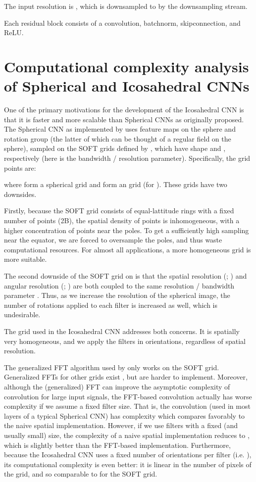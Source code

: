 \documentclass{article}
\begin{document}
The input resolution is , which is downsampled to  by the downsampling stream.

Each residual block consists of a convolution, batchnorm, skipconnection, and ReLU.


\section{Computational complexity analysis of Spherical and Icosahedral CNNs}

One of the primary motivations for the development of the Icosahedral CNN is that it is faster and more scalable than Spherical CNNs as originally proposed.
The Spherical CNN as implemented by \cite{cohenSphericalCNNs2018} uses feature maps on the sphere  and rotation group  (the latter of which can be thought of a regular field on the sphere), sampled on the SOFT grids defined by \cite{kostelecSOFTFourierTransforms2007}, which have shape  and , respectively (here  is the bandwidth / resolution parameter).
Specifically, the grid points are:

where  form a spherical grid and  form an  grid (for ).
These grids have two downsides.

Firstly, because the SOFT grid consists of equal-lattitude rings with a fixed number of points (2B), the spatial density of points is inhomogeneous, with a higher concentration of points near the poles.
To get a sufficiently high sampling near the equator, we are forced to oversample the poles, and thus waste computational resources.
For almost all applications, a more homogeneous grid is more suitable.

The second downside of the SOFT grid on  is that the spatial resolution (; ) and angular resolution (; ) are both coupled to the same resolution / bandwidth parameter .
Thus, as we increase the resolution of the spherical image, the number of rotations applied to each filter is increased as well, which is undesirable.

The grid used in the Icosahedral CNN addresses both concerns.
It is spatially very homogeneous, and we apply the filters in  orientations, regardless of spatial resolution.

The generalized FFT algorithm used by \cite{cohenGeneralTheoryEquivariant2018} only works on the SOFT grid.
Generalized FFTs for other grids exist \cite{kunisFastSphericalFourier2003}, but are harder to implement.
Moreover, although the (generalized) FFT can improve the asymptotic complexity of convolution for large input signals, the FFT-based convolution actually has worse complexity if we assume a fixed filter size.
That is, the  convolution (used in most layers of a typical Spherical CNN) has complexity  which compares favorably to the naive  spatial implementation.
However, if we use filters with a fixed (and usually small) size, the complexity of a naive spatial implementation reduces to , which is slightly better than the FFT-based implementation.
Furthermore, because the Icosahedral CNN uses a fixed number of orientations per filter (i.e. ), its computational complexity is even better: it is linear in the number of pixels of the grid, and so comparable to  for the SOFT grid.
\end{document}
